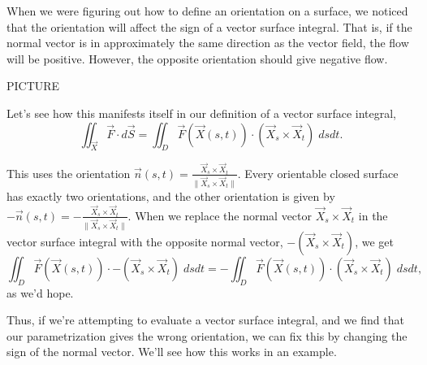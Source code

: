 \documentclass{ximera}
\begin{document}
When we were figuring out how to define an orientation on a surface, we noticed that the orientation will affect the sign of a vector surface integral. That is, if the normal vector is in approximately the same direction as the vector field, the flow will be positive. However, the opposite orientation should give negative flow.

PICTURE

Let's see how this manifests itself in our definition of a vector surface integral, 
\[
\iint_{\vec{X}}\vec{F}\cdot d\vec{S} = \iint_D \vec{F}(\vec{X}(s,t))\cdot (\vec{X}_s\times\vec{X}_t)\;dsdt.
\]

This uses the orientation $\vec{n}(s,t) = \frac{\vec{X}_s\times\vec{X}_t}{\|\vec{X}_s\times\vec{X}_t\|}$. Every orientable closed surface has exactly two orientations, and the other orientation is given by $-\vec{n}(s,t) = -\frac{\vec{X}_s\times\vec{X}_t}{\|\vec{X}_s\times\vec{X}_t\|}$. When we replace the normal vector $\vec{X}_s\times\vec{X}_t$ in the vector surface integral with the opposite normal vector, $-(\vec{X}_s\times\vec{X}_t)$, we get
\[
\iint_D \vec{F}(\vec{X}(s,t))\cdot -(\vec{X}_s\times\vec{X}_t)\;dsdt = -\iint_D \vec{F}(\vec{X}(s,t))\cdot (\vec{X}_s\times\vec{X}_t)\;dsdt,
\]
as we'd hope.

Thus, if we're attempting to evaluate a vector surface integral, and we find that our parametrization gives the wrong orientation, we can fix this by changing the sign of the normal vector. We'll see how this works in an example.
\end{document}
